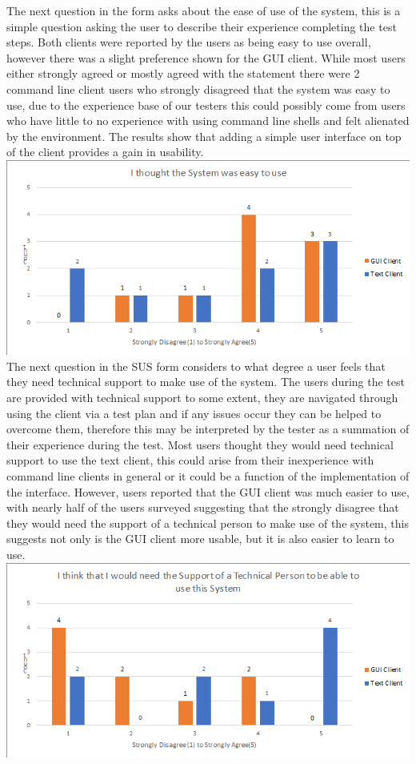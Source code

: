 \documentclass{article}
\begin{document}
The next question in the form asks about the ease of use of the system, this is a simple question asking the user to describe their experience completing the test steps. Both clients were reported by the users as being easy to use overall, however there was a slight preference shown for the GUI client. While most users either strongly agreed or mostly agreed with the statement there were 2 command line client users who strongly disagreed that the system was easy to use, due to the experience base of our testers this could possibly come from users who have little to no experience with using command line shells and felt alienated by the environment. The results show that adding a simple user interface on top of the client provides a gain in usability.\\
\includegraphics[width=\textwidth]{graph3.PNG}
The next question in the SUS form considers to what degree a user feels that they need technical support to make use of the system. The users during the test are provided with technical support to some extent, they are navigated through using the client via a test plan and if any issues occur they can be helped to overcome them, therefore this may be interpreted by the tester as a summation of their experience during the test. Most users thought they would need technical support to use the text client, this could arise from their inexperience with command line clients in general or it could be a function of the implementation of the interface. However, users reported that the GUI client was much easier to use, with nearly half of the users surveyed suggesting that the strongly disagree that they would need the support of a technical person to make use of the system, this suggests not only is the GUI client more usable, but it is also easier to learn to use.
\\
\includegraphics[width=\textwidth]{graph4.PNG}
\end{document}
